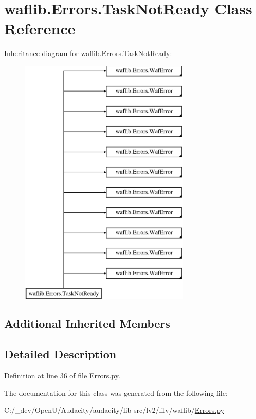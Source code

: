 \hypertarget{classwaflib_1_1_errors_1_1_task_not_ready}{}\section{waflib.\+Errors.\+Task\+Not\+Ready Class Reference}
\label{classwaflib_1_1_errors_1_1_task_not_ready}
Inheritance diagram for waflib.\+Errors.\+Task\+Not\+Ready\+:\begin{figure}[H]
\begin{center}
\leavevmode
\includegraphics[height=12.000000cm]{classwaflib_1_1_errors_1_1_task_not_ready}
\end{center}
\end{figure}
\subsection*{Additional Inherited Members}


\subsection{Detailed Description}


Definition at line 36 of file Errors.\+py.



The documentation for this class was generated from the following file\+:\begin{DoxyCompactItemize}
\item 
C\+:/\+\_\+dev/\+Open\+U/\+Audacity/audacity/lib-\/src/lv2/lilv/waflib/\hyperlink{lilv_2waflib_2_errors_8py}{Errors.\+py}\end{DoxyCompactItemize}
